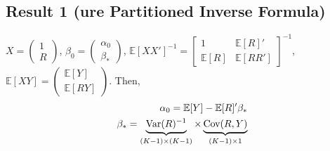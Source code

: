 \documentclass[11pt]{elegantbook}
\begin{document}
\subsection*{Result 1 (ure Partitioned Inverse Formula)}
$X=\begin{pmatrix}
    1\\
    R
\end{pmatrix}$, $\beta_0=\begin{pmatrix}
    \alpha_0\\
    \beta_*
\end{pmatrix}$, $\mathbb{E}[XX']^{-1}=\begin{bmatrix}
    1	& \mathbb{E}[R]'\\
    \mathbb{E}[R]	&\mathbb{E}[RR']
\end{bmatrix}^{-1}$, $\mathbb{E}[XY]=\begin{pmatrix}
    \mathbb{E}[Y]\\
    \mathbb{E}[RY]
\end{pmatrix}$. Then,
\begin{equation}
    \begin{aligned}
        \alpha_0=\mathbb{E}[Y]-\mathbb{E}[R]'\beta_*\\
        \beta_*=\underbrace{\textnormal{Var}(R)^{-1}}_{(K-1)\times(K-1)}\times \underbrace{\textnormal{Cov}(R,Y)}_{(K-1)\times 1}
    \end{aligned}
    \nonumber
\end{equation}
\end{document}
